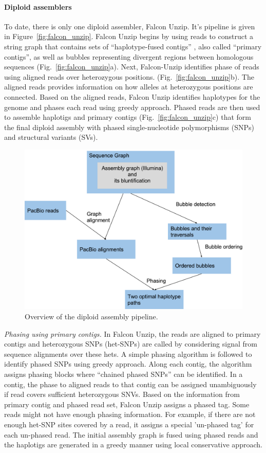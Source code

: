 \paragraph{Diploid assemblers}
To date, there is only one diploid assembler, Falcon Unzip. It's pipeline is given in Figure~\ref{fig:falcon_unzip}.
Falcon Unzip begins by using reads to construct a string graph that contains sets of ``haplotype-fused contigs'' , also called ``primary contigs'', as well as bubbles representing divergent regions between homologous sequences (Fig.~\ref{fig:falcon_unzip}a). 
Next, Falcon-Unzip identifies phase of reads using aligned reads over heterozygous positions. (Fig.~\ref{fig:falcon_unzip}b). 
The aligned reads provides information on how alleles at heterozygous positions are connected. Based on the aligned reads, Falcon Unzip identifies haplotypes for the genome and phases each read using greedy approach.
Phased reads are then used to assemble haplotigs and primary contigs (Fig.~\ref{fig:falcon_unzip}c) 
that form the final diploid assembly with phased single-nucleotide polymorphisms (SNPs) and structural variants (SVs).
\begin{figure}[t!]\centering
\includegraphics[width=.8\columnwidth]{pipeline.pdf}
\caption{Overview of the diploid assembly pipeline. }
\label{fig:pipeline}
\end{figure}
\textit{Phasing using primary contigs.}
In Falcon Unzip, the reads are aligned to primary contigs and heterozygous SNPs (het-SNPs) are called by considering signal from sequence alignments over these hets.
A simple phasing algorithm is followed to identify phased SNPs using greedy approach. 
Along each contig, the algorithm assigns phasing blocks where ``chained phased SNPs'' can be identified. 
In a contig, the phase to aligned reads to that contig can be assigned unambiguously if read covers sufficient heterozygous SNVs.
Based on the information from primary contig and phased read set, Falcon Unzip assigns a phased tag.
Some reads might not have enough phasing information. For example, if there are not enough het-SNP sites covered by a read, it assigns a special 'un-phased tag' for each un-phased read.
The initial assembly graph is fused using phased reads and the haplotigs are generated in a greedy manner using local conservative approach.

